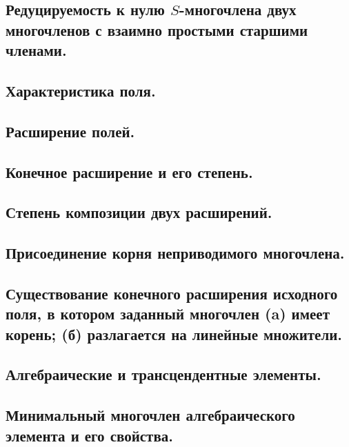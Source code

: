 \mysection
\subsection{Редуцируемость к нулю \texorpdfstring{$S$}{Lg}-многочлена двух многочленов
            с взаимно простыми старшими членами.}

\newpage
\mysection
\subsection{Характеристика поля.}
\subsection{Расширение полей.}
\subsection{Конечное расширение и его степень.}
\subsection{Степень композиции двух расширений.}

\newpage
\mysection
\subsection{Присоединение корня неприводимого многочлена.}
\subsection{Существование конечного расширения исходного поля,
            в котором заданный многочлен (a) имеет корень;
            (б) разлагается на линейные множители.}

\newpage
\mysection
\subsection{Алгебраические и трансцендентные элементы.}
\subsection{Минимальный многочлен алгебраического элемента и его свойства.}

